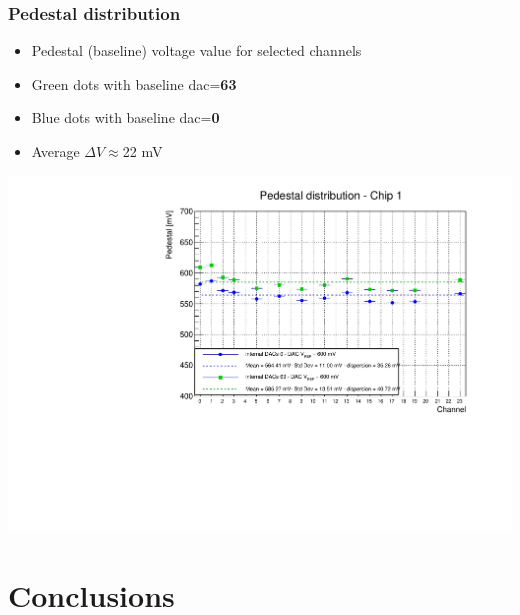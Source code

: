 \documentclass[aspectratio=169]{beamer}
\begin{document}
	\begin{frame}
	\frametitle{Pedestal distribution}
	\begin{itemize}
		\item Pedestal (baseline) voltage value for selected channels
		\item {\color{green}Green} dots with baseline dac=\textbf{63}
		\item {\color{blue}Blue} dots with baseline dac=\textbf{0}
		\item Average $\Delta V\approx$22 mV
	\end{itemize}
	\begin{center}
		\includegraphics[width=0.55 \textwidth]{data/DAC_V_REF_600mV-Copia.pdf}
	\end{center}
	
\end{frame}

	\section{Conclusions}
	
\end{document}
